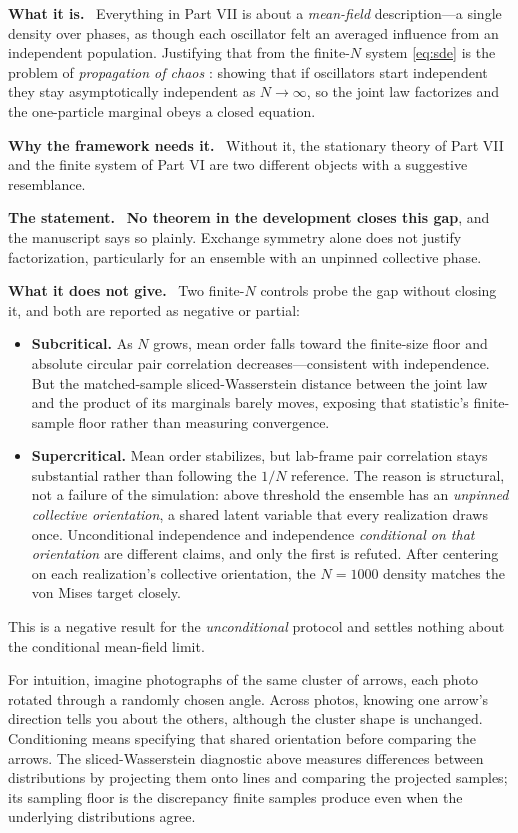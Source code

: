 \documentclass[11pt]{article}
\newcommand{\what}{\par\smallskip\noindent\textbf{What it is.}\ }
\newcommand{\why}{\par\smallskip\noindent\textbf{Why the framework needs it.}\ }
\newcommand{\statement}{\par\smallskip\noindent\textbf{The statement.}\ }
\newcommand{\scope}{\par\smallskip\noindent\textbf{What it does not give.}\ }
\begin{document}
\what
Everything in Part VII is about a \emph{mean-field} description---a single
density over phases, as though each oscillator felt an averaged influence from
an independent population. Justifying that from the finite-$N$ system
\eqref{eq:sde} is the problem of \emph{propagation of chaos}
\citep{sznitman1991}: showing that if oscillators start independent they stay
asymptotically independent as $N\to\infty$, so the joint law factorizes and the
one-particle marginal obeys a closed equation.

\why
Without it, the stationary theory of Part VII and the finite system of
Part VI are two different objects with a suggestive resemblance.

\statement
\textbf{No theorem in the development closes this gap}, and the manuscript says
so plainly. Exchange symmetry alone does not justify factorization,
particularly for an ensemble with an unpinned collective phase.

\scope
Two finite-$N$ controls probe the gap without closing it, and both are
reported as negative or partial:
\begin{itemize}[leftmargin=*]
\item \textbf{Subcritical.} As $N$ grows, mean order falls toward the
finite-size floor and absolute circular pair correlation decreases---consistent
with independence. But the matched-sample sliced-Wasserstein distance between
the joint law and the product of its marginals barely moves, exposing that
statistic's finite-sample floor rather than measuring convergence.
\item \textbf{Supercritical.} Mean order stabilizes, but lab-frame pair
correlation stays substantial rather than following the $1/N$ reference. The
reason is structural, not a failure of the simulation: above threshold the
ensemble has an \emph{unpinned collective orientation}, a shared latent
variable that every realization draws once. Unconditional independence and
independence \emph{conditional on that orientation} are different claims, and
only the first is refuted. After centering on each realization's collective
orientation, the $N=1000$ density matches the von Mises target closely.
\end{itemize}
This is a negative result for the \emph{unconditional} protocol and settles
nothing about the conditional mean-field limit.

For intuition, imagine photographs of the same cluster of arrows, each photo
rotated through a randomly chosen angle. Across photos, knowing one arrow's
direction tells you about the others, although the cluster shape is unchanged.
Conditioning means specifying that shared orientation before comparing the
arrows. The sliced-Wasserstein diagnostic above measures differences between
distributions by projecting them onto lines and comparing the projected samples;
its sampling floor is the discrepancy finite samples produce even when the
underlying distributions agree.
\end{document}
